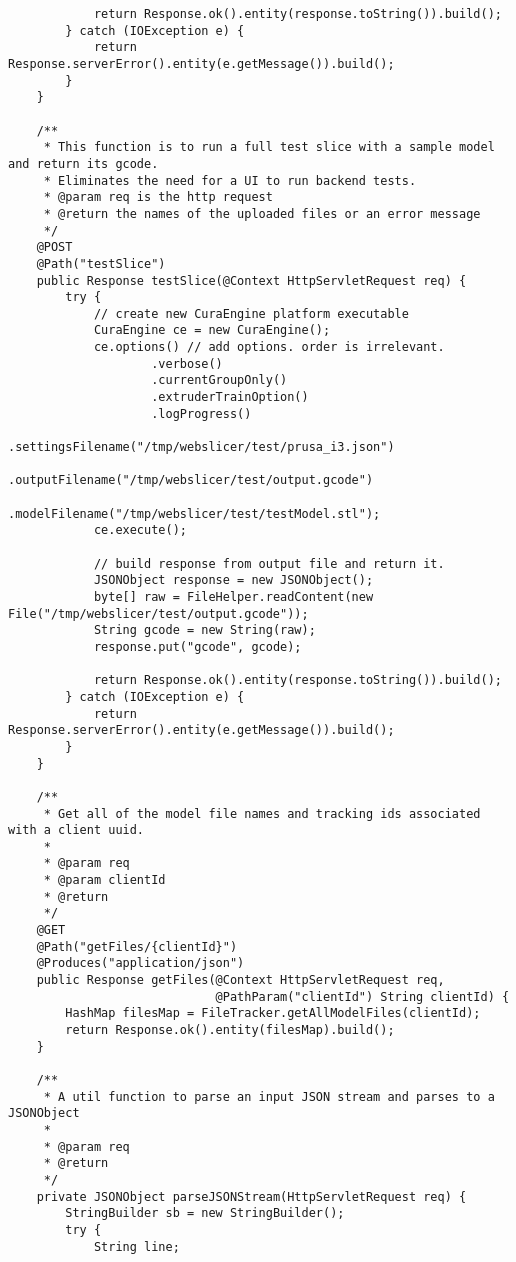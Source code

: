 \begin{lstlisting}
            return Response.ok().entity(response.toString()).build();
        } catch (IOException e) {
            return Response.serverError().entity(e.getMessage()).build();
        }
    }

    /**
     * This function is to run a full test slice with a sample model and return its gcode.
     * Eliminates the need for a UI to run backend tests.
     * @param req is the http request
     * @return the names of the uploaded files or an error message
     */
    @POST
    @Path("testSlice")
    public Response testSlice(@Context HttpServletRequest req) {
        try {
            // create new CuraEngine platform executable
            CuraEngine ce = new CuraEngine();
            ce.options() // add options. order is irrelevant.
                    .verbose()
                    .currentGroupOnly()
                    .extruderTrainOption()
                    .logProgress()
                    .settingsFilename("/tmp/webslicer/test/prusa_i3.json")
                    .outputFilename("/tmp/webslicer/test/output.gcode")
                    .modelFilename("/tmp/webslicer/test/testModel.stl");
            ce.execute();

            // build response from output file and return it.
            JSONObject response = new JSONObject();
            byte[] raw = FileHelper.readContent(new File("/tmp/webslicer/test/output.gcode"));
            String gcode = new String(raw);
            response.put("gcode", gcode);

            return Response.ok().entity(response.toString()).build();
        } catch (IOException e) {
            return Response.serverError().entity(e.getMessage()).build();
        }
    }

    /**
     * Get all of the model file names and tracking ids associated with a client uuid.
     *
     * @param req
     * @param clientId
     * @return
     */
    @GET
    @Path("getFiles/{clientId}")
    @Produces("application/json")
    public Response getFiles(@Context HttpServletRequest req,
                             @PathParam("clientId") String clientId) {
        HashMap filesMap = FileTracker.getAllModelFiles(clientId);
        return Response.ok().entity(filesMap).build();
    }

    /**
     * A util function to parse an input JSON stream and parses to a JSONObject
     *
     * @param req
     * @return
     */
    private JSONObject parseJSONStream(HttpServletRequest req) {
        StringBuilder sb = new StringBuilder();
        try {
            String line;


\end{lstlisting}
